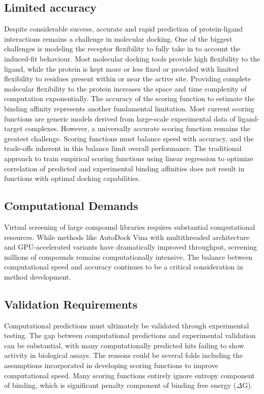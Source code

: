 \subsection{Limited accuracy}
Despite considerable success, accurate and rapid prediction of protein-ligand interactions remains a challenge in molecular docking. One of the biggest challenges is modeling the receptor flexibility to fully take in to account the induced-fit behaviour. Most molecular docking tools provide high flexibility to the ligand, while the protein is kept more or less fixed or provided with limited flexibility to residues present within or near the active site. Providing complete molecular flexibility to the protein increases the space and time complexity of computation exponentially. The accuracy of the scoring function to estimate the binding affinity represents another fundamental limitation. Most current scoring functions are generic models derived from large-scale experimental data of ligand-target complexes. However, a universally accurate scoring function remains the greatest challenge. Scoring functions must balance speed with accuracy, and the trade-offs inherent in this balance limit overall performance. The traditional approach to train empirical scoring functions using linear regression to optimize correlation of predicted and experimental binding affinities does not result in functions with optimal docking capabilities\cite{CH1_21}.

\subsection{Computational Demands}
Virtual screening of large compound libraries requires substantial computational resources. While methods like AutoDock Vina with multithreaded architecture and GPU-accelerated variants have dramatically improved throughput, screening millions of compounds remains computationally intensive. The balance between computational speed and accuracy continues to be a critical consideration in method development\cite{CH1_22, CH1_23}.

\subsection{Validation Requirements}
Computational predictions must ultimately be validated through experimental testing. The gap between computational predictions and experimental validation can be substantial, with many computationally predicted hits failing to show activity in biological assays. The reasons could be several folds including the assumptions incorporated in developing scoring functions to improve computational speed. Many scoring functions entirely ignore entropy component of binding, which is significant penalty component of binding free energy ($\Delta$G).

